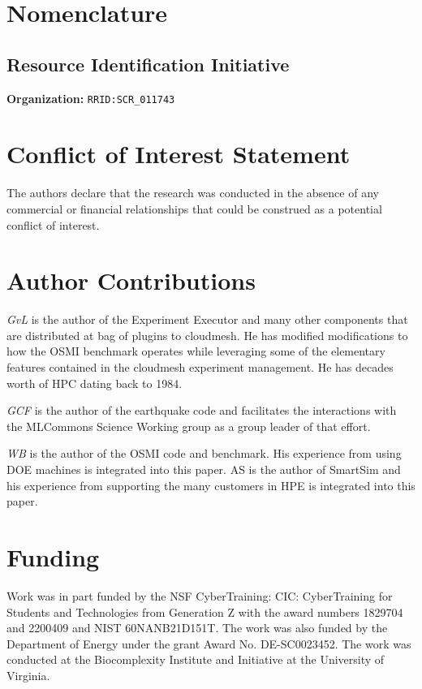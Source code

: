 \documentclass[utf8]{FrontiersinVancouver} %
\begin{document}
\section{Nomenclature}

\subsection{Resource Identification Initiative}

{\bf Organization:} \verb|RRID:SCR_011743|

\section*{Conflict of Interest Statement}

The authors declare that the research was conducted in the absence of any commercial or financial relationships that could be construed as a potential conflict of interest.

\section*{Author Contributions}

{\em GvL} is the author of the Experiment Executor and many other components that are distributed at bag of plugins to cloudmesh.  He has modified modifications to how the OSMI benchmark operates while leveraging some of the elementary features contained in the cloudmesh experiment management. He has decades worth of HPC dating back to 1984. 

{\em GCF} is the author of the earthquake code and facilitates the interactions with the MLCommons Science Working group as a group leader of that effort. 


{\em WB} is the author of the OSMI code and benchmark. His experience from using DOE machines is integrated into this paper. {AS} is the author of SmartSim and his experience from supporting the many customers in HPE is integrated into this paper.

\section*{Funding}

Work was in part funded by the NSF CyberTraining: CIC: CyberTraining for Students and Technologies from Generation Z with the award numbers 1829704 and 2200409 and NIST 60NANB21D151T.  The work was also funded by the Department of Energy under the grant Award No. DE-SC0023452. The work was conducted at the Biocomplexity Institute and Initiative at the University of Virginia.
\end{document}
